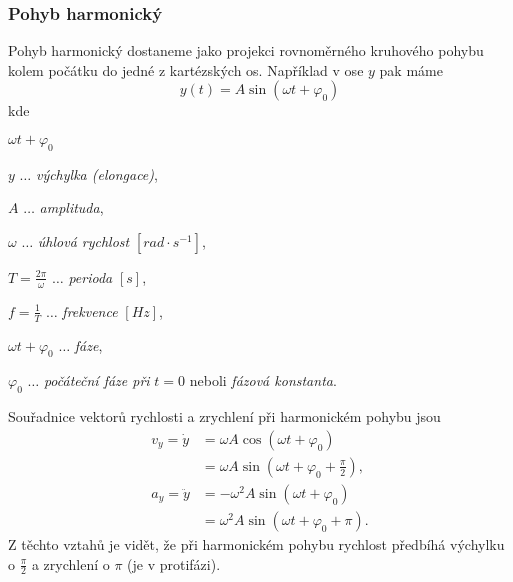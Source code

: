       \subsubsection{Pohyb harmonický}
        Pohyb harmonický dostaneme jako projekci rovnoměrného kruhového pohybu kolem počátku do
        jedné z kartézských os. Například v ose $y$ pak máme
        \begin{equation}\label{mech:eq_p_harmon}
          y(t)=A\sin(\omega t+\varphi_0)
        \end{equation}
        kde 
        \begin{labeling}{$\omega t+\varphi_0$}
          \setlength{\itemindent}{2cm}
          \item[\(y\)]                     \(\ldots\) \emph{výchylka (elongace)}, 
          \item[\(A\)]                     \(\ldots\) \emph{amplituda}, 
          \item[\(\omega\)]                \(\ldots\) \emph{úhlová rychlost} $[rad\cdot s^{-1}]$,
          \item[\(T=\frac{2\pi}{\omega}\)] \(\ldots\) \emph{perioda} $[s]$, 
          \item[\(f=\frac{1}{T}\)]         \(\ldots\) \emph{frekvence} $[Hz]$, 
          \item[\(\omega t+\varphi_0\)]    \(\ldots\) \emph{fáze}, 
          \item[\(\varphi_0\)]             \(\ldots\) \emph{počáteční fáze při} $t=0$ neboli
                                                      \emph{fázová konstanta}.
        \end{labeling}
  
        Souřadnice vektorů rychlosti a zrychlení při harmonickém pohybu jsou
        \begin{subequations}
          \label{mech:eq_harm} 
          \begin{align}
            v_y = \dot{y} 
              & = \omega A\cos(\omega t+\varphi_0 )               \nonumber \\
              & = \omega A\sin(\omega t+\varphi_0+\frac{\pi}{2}), \label{mech:eq_harm_vy}         \\
            a_y = \ddot{y} 
              &= -\omega^2A\sin(\omega t+\varphi_0 )              \nonumber \\
              &=  \omega^2A\sin(\omega t+\varphi_0+\pi).          \label{mech:eq_harm_ay}
          \end{align}
        \end{subequations}  
        Z těchto vztahů je vidět, že při harmonickém pohybu rychlost předbíhá výchylku o
        $\frac{\pi}{2}$ a zrychlení o $\pi$ (je v protifázi).

